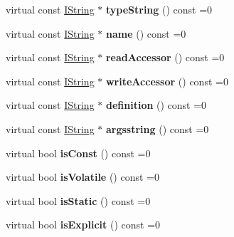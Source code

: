 \begin{DoxyCompactItemize}
\item 
\hypertarget{class_i_member_a6b227ab8a5260d41d25327b442fe90a6}{virtual const \hyperlink{class_i_string}{I\-String} $\ast$ {\bfseries type\-String} () const =0}\label{class_i_member_a6b227ab8a5260d41d25327b442fe90a6}

\item 
\hypertarget{class_i_member_af687440943d0a80c2b38cd5bb51b7a68}{virtual const \hyperlink{class_i_string}{I\-String} $\ast$ {\bfseries name} () const =0}\label{class_i_member_af687440943d0a80c2b38cd5bb51b7a68}

\item 
\hypertarget{class_i_member_a981bb3f4a489c31ca2e17582cc687019}{virtual const \hyperlink{class_i_string}{I\-String} $\ast$ {\bfseries read\-Accessor} () const =0}\label{class_i_member_a981bb3f4a489c31ca2e17582cc687019}

\item 
\hypertarget{class_i_member_a3c64b76bbd02b44584152827575552f3}{virtual const \hyperlink{class_i_string}{I\-String} $\ast$ {\bfseries write\-Accessor} () const =0}\label{class_i_member_a3c64b76bbd02b44584152827575552f3}

\item 
\hypertarget{class_i_member_a8963fa87be4decd328e09f3901c17605}{virtual const \hyperlink{class_i_string}{I\-String} $\ast$ {\bfseries definition} () const =0}\label{class_i_member_a8963fa87be4decd328e09f3901c17605}

\item 
\hypertarget{class_i_member_a536e580cd8790da912087a4c99704fed}{virtual const \hyperlink{class_i_string}{I\-String} $\ast$ {\bfseries argsstring} () const =0}\label{class_i_member_a536e580cd8790da912087a4c99704fed}

\item 
\hypertarget{class_i_member_a7c3a9ca9e5a52323ee7807583d6a0a78}{virtual bool {\bfseries is\-Const} () const =0}\label{class_i_member_a7c3a9ca9e5a52323ee7807583d6a0a78}

\item 
\hypertarget{class_i_member_adab44fe34e47715b3f6e199f9e97a36e}{virtual bool {\bfseries is\-Volatile} () const =0}\label{class_i_member_adab44fe34e47715b3f6e199f9e97a36e}

\item 
\hypertarget{class_i_member_a0ed1f9eef230e6f2ccae812d1037aa0f}{virtual bool {\bfseries is\-Static} () const =0}\label{class_i_member_a0ed1f9eef230e6f2ccae812d1037aa0f}

\item 
\hypertarget{class_i_member_a87310d5423d451c310fdad45417ef5aa}{virtual bool {\bfseries is\-Explicit} () const =0}\label{class_i_member_a87310d5423d451c310fdad45417ef5aa}


\end{DoxyCompactItemize}
